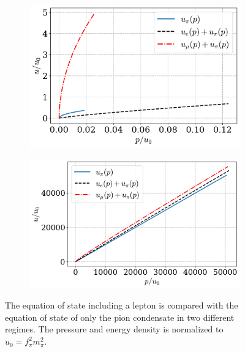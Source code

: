 \begin{figure}
    \centering
    \begin{subfigure}{0.49\textwidth}
        \includegraphics[width=\textwidth]{../scripts/figurer/charge_neutrality/eos_nr.pdf}
    \end{subfigure}
    \begin{subfigure}{0.49\textwidth}
        \includegraphics[width=\textwidth]{../scripts/figurer/charge_neutrality/eos_ur.pdf}
    \end{subfigure}
    \caption{
        The equation of state including a lepton is compared with the equation of state of only the pion condensate in two different regimes.
        The pressure and energy density is normalized to $u_0 = f_\pi^2 m_\pi^2$.
    }
    \label{fig: eos with leptons}
\end{figure}


